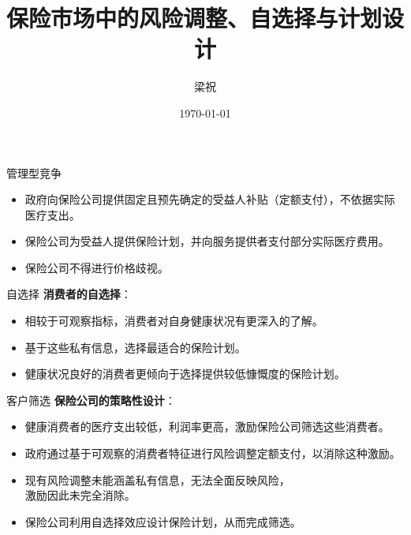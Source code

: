 \documentclass[professionalfonts, aspectratio=169]{beamer}
\title{保险市场中的风险调整、自选择与计划设计}
\institute{Stony Brook University}
\author{梁祝}
\date{\today}
\begin{document}

\begin{frame} %
    \titlepage
\end{frame}


\begin{frame}{管理型竞争}
  \begin{itemize}
      \item 政府向保险公司提供固定且预先确定的受益人补贴（定额支付），不依据实际医疗支出。
      \item 保险公司为受益人提供保险计划，并向服务提供者支付部分实际医疗费用。
      \item 保险公司不得进行价格歧视。
  \end{itemize}
\end{frame}

\begin{frame}{自选择}
  \textbf{消费者的自选择}：
  \begin{itemize}
    \item 相较于可观察指标，消费者对自身健康状况有更深入的了解。
    \item 基于这些私有信息，选择最适合的保险计划。
    \item 健康状况良好的消费者更倾向于选择提供较低慷慨度的保险计划。
  \end{itemize}
\end{frame}

\begin{frame}{客户筛选}
  \textbf{保险公司的策略性设计}：
  \begin{itemize}
    \item 健康消费者的医疗支出较低，利润率更高，激励保险公司筛选这些消费者。
    \item 政府通过基于可观察的消费者特征进行风险调整定额支付，以消除这种激励。
    \item 现有风险调整未能涵盖私有信息，无法全面反映风险，\\激励因此未完全消除。
      \hyperlink{simplifiedRiskAdjustment}{}
    \item 保险公司利用自选择效应设计保险计划，从而完成筛选。
  \end{itemize}
\end{frame}
\end{document}
